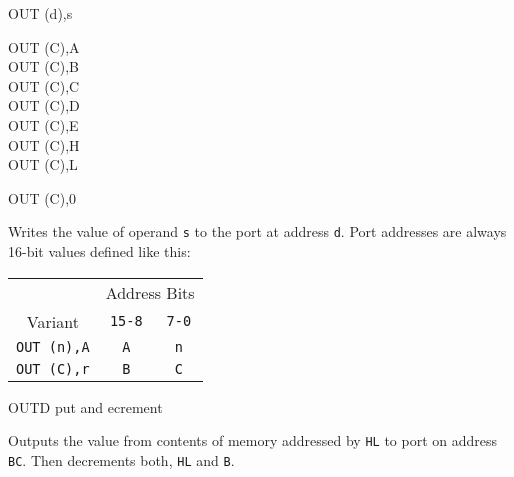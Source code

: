 \begin{basedescript}{
    \desclabelstyle{\multilinelabel}
    \desclabelwidth{3cm}}
\begin{DetailItem}{OUT (d),s}
\begin{DetailVariants}
            \columnbreak
            OUT (C),A\\
            OUT (C),B\\
            OUT (C),C\\
            OUT (C),D\\
            OUT (C),E\\
            OUT (C),H\\
            OUT (C),L

            \columnbreak
            OUT (C),0\UNDOC
        \end{DetailVariants}

        Writes the value of operand {\tt s} to the port at address {\tt d}. Port addresses are always 16-bit values defined like this:

        \begin{tabular}{ccc}
            & \multicolumn{2}{c}{Address Bits} \\
            Variant & {\tt 15-8} & {\tt 7-0} \\
            \hline
            {\tt OUT (n),A} & {\tt A} & {\tt n} \\
            {\tt OUT (C),r} & {\tt B} & {\tt C} \\
        \end{tabular}
        \vspace{1ex} %

        \begin{DetailEffects}
            \FlagsOUTcr
        \end{DetailEffects}
		
        \begin{DetailTiming}
        \end{DetailTiming}


    \end{DetailItem}

    \label{DetailRefOUTD}
    \begin{DetailItem}{OUTD}
        {put and ecrement}
        {\SymOUTD}

        Outputs the value from contents of memory addressed by {\tt HL} to port on address {\tt BC}. Then decrements both, {\tt HL} and {\tt B}.


\end{DetailItem}
\end{basedescript}
